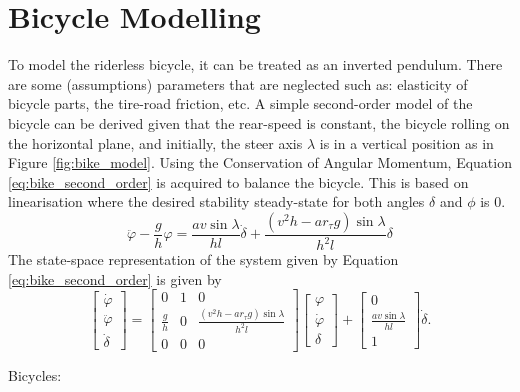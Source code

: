 \section{Bicycle Modelling}
\label{sec:bike_modelling}
	To model the riderless bicycle, it can be treated as an inverted pendulum. There are some (assumptions) parameters that are neglected such as: elasticity of bicycle parts, the tire-road friction, etc. A simple second-order model of the bicycle can be derived given that the rear-speed is constant, the bicycle rolling on the horizontal plane, and initially, the steer axis $\lambda$ is in a vertical position as in Figure \ref{fig:bike_model}. Using the Conservation of Angular Momentum, Equation \ref{eq:bike_second_order} is acquired to balance the bicycle. This is based on linearisation where the desired stability steady-state for both angles $\delta$ and $\phi$ is 0.
	\begin{equation}
		\label{eq:bike_second_order}
		\ddot{\varphi} - \frac{g}{h} \varphi = \frac{av \sin \lambda}{hl} \dot{\delta} + \frac{\left(v^2 h - ar_\tau g\right) \sin \lambda}{h^2 l} \delta
	\end{equation}
	The state-space representation of the system given by Equation \ref{eq:bike_second_order} is given by
	\begin{equation}
		\label{eq:bike_state_equation}
		\begin{bmatrix}
			\dot{\varphi} \\
			\ddot{\varphi} \\
			\dot{\delta}
		\end{bmatrix}
		=
		\begin{bmatrix}
			0 & 1 & 0 \\
			\frac{g}{h} & 0 & \frac{\left(v^2 h - a r_\tau g\right) \sin \lambda}{h^2 l} \\
			0 & 0 & 0
		\end{bmatrix}
		\begin{bmatrix}
			\varphi \\
			\dot{\varphi} \\
			\delta
		\end{bmatrix}
		+
		\begin{bmatrix}
			0 \\
			\frac{a v \sin \lambda}{h l} \\
			1
		\end{bmatrix}
		\dot{\delta}.
	\end{equation}




	Bicycles:

